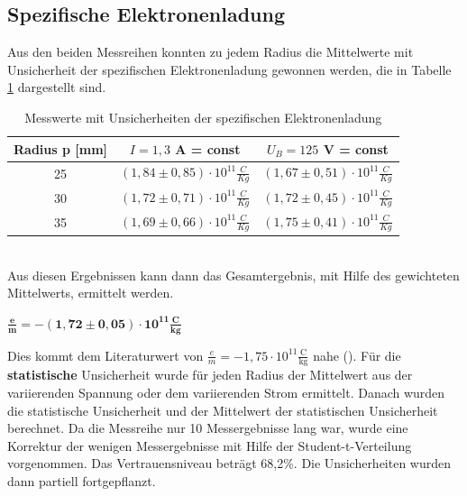 \documentclass[a4paper,usenatbib]{aspdoc}
\begin{document}
        \subsection{Spezifische Elektronenladung}\label{subsec:specelectron}
            Aus den beiden Messreihen konnten zu jedem Radius die Mittelwerte mit Unsicherheit der spezifischen Elektronenladung gewonnen werden, die in Tabelle \ref{tab:sel} dargestellt sind. 
            \begin{table}
                \centering
                \begin{tabular}{c|c|c}
                    \multicolumn{1}{c}{ Radius p [mm]} & \multicolumn{1}{c}{$I = 1,3$ A = const} & \multicolumn{1}{c}{$U_B = 125$ V = const}\\
                    \cmidrule(l){0-0}\cmidrule(lr){2-2}\cmidrule(lr){3-3}
                    \toprule
                    25 & $(1,84 \pm 0,85) \cdot 10^{11} \frac{C}{Kg}$ & $(1,67 \pm 0,51) \cdot 10^{11} \frac{C}{Kg}$ \\
                    30 & $(1,72 \pm 0,71) \cdot 10^{11} \frac{C}{Kg}$ & $(1,72 \pm 0,45) \cdot 10^{11} \frac{C}{Kg}$ \\
                    35 & $(1,69 \pm 0,66) \cdot 10^{11} \frac{C}{Kg}$ & $(1,75 \pm 0,41) \cdot 10^{11} \frac{C}{Kg}$ \\
                    \bottomrule
                \end{tabular}
                \caption{Messwerte mit Unsicherheiten der spezifischen Elektronenladung}
                \label{tab:sel}
            \end{table}
            \\
            Aus diesen Ergebnissen kann dann das Gesamtergebnis, mit Hilfe des gewichteten Mittelwerts, ermittelt werden. 
            \begin{center}
                $\mathbf{\frac{e}{m} = -(1,72 \pm 0,05) \cdot 10^{11} \frac{C}{kg}}$
            \end{center} 
            Dies kommt dem Literaturwert von $\frac{e}{m} = -1,75 \cdot 10^{11} \frac{\mathrm{C}}{\mathrm{kg}}$ nahe (\cite{gerthsen}).
            Für die \textbf{statistische} Unsicherheit wurde für jeden Radius der Mittelwert aus der variierenden Spannung oder dem variierenden Strom ermittelt. Danach wurden die statistische Unsicherheit und der Mittelwert der statistischen Unsicherheit berechnet. Da die Messreihe nur 10 Messergebnisse lang war, wurde eine Korrektur der wenigen Messergebnisse mit Hilfe der Student-t-Verteilung vorgenommen. Das Vertrauensniveau beträgt 68,2\%. Die Unsicherheiten wurden dann partiell fortgepflanzt.\\
\end{document}

